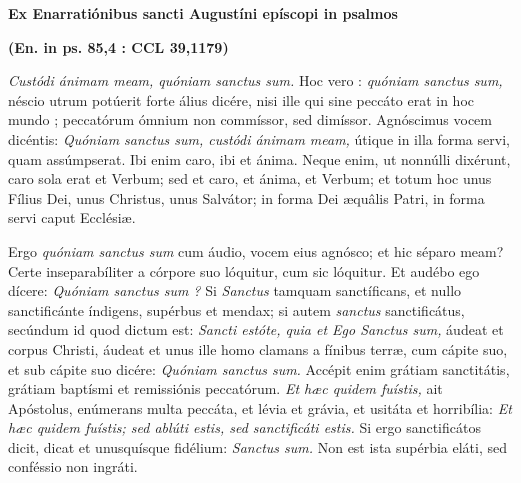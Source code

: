 \documentclass[options]{article}
\begin{document}
	\textbf{Ex Enarratiónibus sancti Augustíni epíscopi in psalmos}
	
	\textbf{(En. in ps. 85,4 : CCL 39,1179)}
	
	
	\textit{Custódi ánimam meam, quóniam sanctus sum.}
		Hoc vero :
		\textit{quóniam sanctus sum,}
		néscio utrum potúerit forte álius dicére, nisi ille qui sine peccáto erat in hoc mundo ; peccatórum ómnium non commíssor, sed dimíssor. Agnóscimus vocem dicéntis: 
		\textit{Quóniam sanctus sum, custódi ánimam meam,}
		útique in illa forma servi, quam assúmpserat. Ibi enim caro, ibi et ánima. Neque enim, ut nonnúlli dixérunt, caro sola erat et Verbum; sed et caro, et ánima, et Verbum; et totum hoc unus Fílius Dei, unus Christus, unus Salvátor; in forma Dei æquâlis Patri, in forma servi caput Ecclésiæ.
		
		Ergo 
		\textit{quóniam sanctus sum}
		cum áudio, vocem eius agnósco; et hic séparo meam? Certe inseparabíliter a córpore suo lóquitur, cum sic lóquitur. Et audébo ego dícere: 
		\textit{Quóniam sanctus sum ?}
		Si
		\textit{Sanctus}
		tamquam sanctíficans, et nullo sanctificánte índigens, supérbus et mendax; si autem 
		\textit{sanctus}
		sanctificátus, secúndum id quod dictum est: 
		\textit{Sancti estóte, quia et Ego Sanctus sum,}
		áudeat et corpus Christi, áudeat et unus ille homo clamans a fínibus terræ, cum cápite suo, et sub cápite suo dicére: 
		\textit{Quóniam sanctus sum.}
		Accépit enim grátiam sanctitátis, grátiam baptísmi et remissiónis peccatórum. 
		\textit{Et hæc quidem fuístis,}
		ait Apóstolus, enúmerans multa peccáta, et lévia et grávia, et usitáta et horribília:
		\textit{Et hæc quidem fuístis; sed ablúti estis, sed sanctificáti estis.}
		Si ergo sanctificátos dicit, dicat et unusquísque fidélium:
		\textit{Sanctus sum.}
		Non est ista supérbia eláti, sed conféssio non ingráti.
		
			
	
\end{document}
